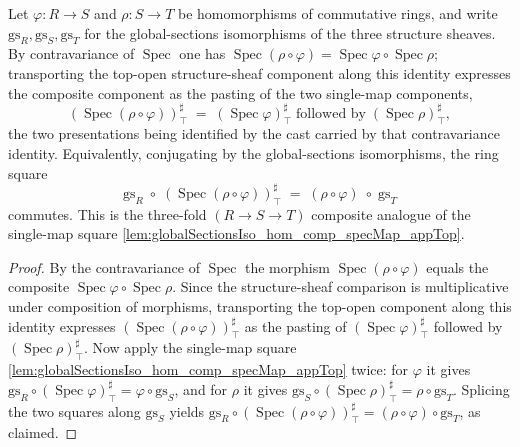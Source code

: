 \begin{lemma}


  \label{lem:globalSectionsIso_hom_comp3_specMap_appTop}
  Let \(\varphi : R \to S\) and \(\rho : S \to T\) be homomorphisms of commutative
  rings, and write \(\mathrm{gs}_R, \mathrm{gs}_S, \mathrm{gs}_T\) for the
  global-sections isomorphisms of the three structure sheaves. By contravariance of
  \(\operatorname{Spec}\) one has
  \(\operatorname{Spec}(\rho\circ\varphi) = \operatorname{Spec}\varphi \circ
  \operatorname{Spec}\rho\); transporting the top-open structure-sheaf component along
  this identity expresses the composite component as the pasting of the two single-map
  components,
  \[
    (\operatorname{Spec}(\rho\circ\varphi))^{\sharp}_{\top}
      \;=\;
    (\operatorname{Spec}\varphi)^{\sharp}_{\top}
      \;\text{followed by}\;
    (\operatorname{Spec}\rho)^{\sharp}_{\top},
  \]
  the two presentations being identified by the cast carried by that contravariance
  identity. Equivalently, conjugating by the global-sections isomorphisms, the ring
  square
  \[
    \mathrm{gs}_R \;\circ\; (\operatorname{Spec}(\rho\circ\varphi))^{\sharp}_{\top}
    \;=\; (\rho\circ\varphi) \;\circ\; \mathrm{gs}_T
  \]
  commutes. This is the three-fold \((R \to S \to T)\) composite analogue of the
  single-map square \cref{lem:globalSectionsIso_hom_comp_specMap_appTop}.
\end{lemma}

\begin{proof}
  By the contravariance of \(\operatorname{Spec}\) the morphism
  \(\operatorname{Spec}(\rho\circ\varphi)\) equals the composite
  \(\operatorname{Spec}\varphi \circ \operatorname{Spec}\rho\). Since the structure-sheaf
  comparison is multiplicative under composition of morphisms, transporting the top-open
  component along this identity expresses
  \((\operatorname{Spec}(\rho\circ\varphi))^{\sharp}_{\top}\) as the pasting of
  \((\operatorname{Spec}\varphi)^{\sharp}_{\top}\) followed by
  \((\operatorname{Spec}\rho)^{\sharp}_{\top}\). Now apply the single-map square
  \cref{lem:globalSectionsIso_hom_comp_specMap_appTop} twice: for \(\varphi\) it gives
  \(\mathrm{gs}_R \circ (\operatorname{Spec}\varphi)^{\sharp}_{\top}
  = \varphi \circ \mathrm{gs}_S\), and for \(\rho\) it gives
  \(\mathrm{gs}_S \circ (\operatorname{Spec}\rho)^{\sharp}_{\top}
  = \rho \circ \mathrm{gs}_T\). Splicing the two squares along \(\mathrm{gs}_S\) yields
  \(\mathrm{gs}_R \circ (\operatorname{Spec}(\rho\circ\varphi))^{\sharp}_{\top}
  = (\rho\circ\varphi) \circ \mathrm{gs}_T\), as claimed.
\end{proof}

